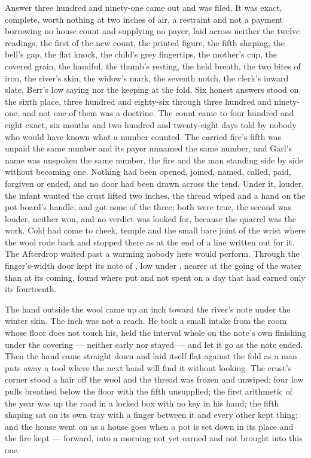 Answer three hundred and ninety-one came out and was filed. It was exact, complete, worth nothing at two inches of air, a restraint and not a payment borrowing no house count and supplying no payer, laid across neither the twelve readings, the first of the new count, the printed figure, the fifth shaping, the bell's gap, the flat knock, the child's grey fingertips, the mother's cup, the covered grain, the handful, the thumb's resting, the held breath, the two bites of iron, the river's skin, the widow's mark, the seventh notch, the clerk's inward slate, Berr's low saying nor the keeping at the fold. Six honest answers stood on the sixth place, three hundred and eighty-six through three hundred and ninety-one, and not one of them was a doctrine. The count came to four hundred and eight exact, six months and two hundred and twenty-eight days told by nobody who would have known what a number counted. The carried fire's fifth was unpaid the same number and its payer unnamed the same number, and Garl's name was unspoken the same number, the fire and the man standing side by side without becoming one. Nothing had been opened, joined, named, called, paid, forgiven or ended, and no door had been drawn across the tend. Under it, louder, the infant wanted the crust lifted two inches, the thread wiped and a hand on the pot board's handle, and got none of the three; both were true, the second was louder, neither won, and no verdict was looked for, because the quarrel was the work. Cold had come to cheek, temple and the small bare joint of the wrist where the wool rode back and stopped there as at the end of a line written out for it. The Afterdrop waited past a warming nobody here would perform. Through the finger's-width door  kept its note of , low under , nearer at the going of the water than at its coming, found where put and not spent on a day that had earned only its fourteenth.

The hand outside the wool came up an inch toward the river's note under the winter skin. The inch was not a reach. He took a small intake from the room whose floor does not touch his, held the interval whole on the note's own finishing under the covering --- neither early nor stayed --- and let it go as the note ended. Then the hand came straight down and laid itself flat against the fold as a man puts away a tool where the next hand will find it without looking. The crust's corner stood a hair off the wool and the thread was frozen and unwiped; four low pulls breathed below the floor with the fifth unsupplied; the first arithmetic of the year was up the road in a locked box with no key in his hand; the fifth shaping sat on its own tray with a finger between it and every other kept thing; and the house went on as a house goes when a pot is set down in its place and the fire kept --- forward, into a morning not yet earned and not brought into this one.
